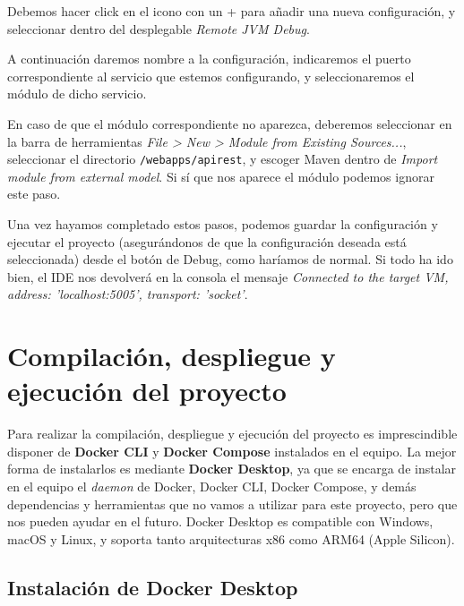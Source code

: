 
Debemos hacer click en el icono con un + para añadir una nueva configuración, y seleccionar dentro del desplegable \textit{Remote JVM Debug}.


A continuación daremos nombre a la configuración, indicaremos el puerto correspondiente al servicio que estemos configurando, y seleccionaremos el módulo de dicho servicio.


En caso de que el módulo correspondiente no aparezca, deberemos seleccionar en la barra de herramientas \textit{File > New > Module from Existing Sources...}, seleccionar el directorio \verb,/webapps/apirest,, y escoger Maven dentro de \textit{Import module from external model}. Si sí que nos aparece el módulo podemos ignorar este paso.


Una vez hayamos completado estos pasos, podemos guardar la configuración y ejecutar el proyecto (asegurándonos de que la configuración deseada está seleccionada) desde el botón de Debug, como haríamos de normal. Si todo ha ido bien, el IDE nos devolverá en la consola el mensaje \textit{Connected to the target VM, address: 'localhost:5005', transport: 'socket'}.

\section{Compilación, despliegue y ejecución del proyecto}

Para realizar la compilación, despliegue y ejecución del proyecto es imprescindible disponer de \textbf{Docker CLI} y \textbf{Docker Compose} instalados en el equipo. La mejor forma de instalarlos es mediante \textbf{Docker Desktop}, ya que se encarga de instalar en el equipo el \textit{daemon} de Docker, Docker CLI, Docker Compose, y demás dependencias y herramientas que no vamos a utilizar para este proyecto, pero que nos pueden ayudar en el futuro. Docker Desktop es compatible con Windows, macOS y Linux, y soporta tanto arquitecturas x86 como ARM64 (Apple Silicon).

\subsection{Instalación de Docker Desktop}

